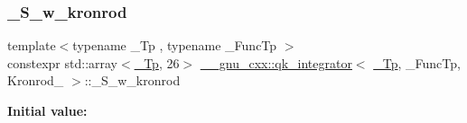 \subsubsection{\texorpdfstring{\+\_\+\+S\+\_\+w\+\_\+kronrod}{\_S\_w\_kronrod}}
{\footnotesize\ttfamily template$<$typename \+\_\+\+Tp , typename \+\_\+\+Func\+Tp $>$ \\
constexpr std\+::array$<$\hyperlink{namespace____gnu__cxx_a3b19a9c800ca194374ef9172290f7d79}{\+\_\+\+Tp}, 26$>$ \hyperlink{class____gnu__cxx_1_1qk__integrator}{\+\_\+\+\_\+gnu\+\_\+cxx\+::qk\+\_\+integrator}$<$ \hyperlink{namespace____gnu__cxx_a3b19a9c800ca194374ef9172290f7d79}{\+\_\+\+Tp}, \+\_\+\+Func\+Tp, Kronrod\+\_ $>$\+::\+\_\+\+S\+\_\+w\+\_\+kronrod\hspace{0.3cm}{\ttfamily [static]}}

{\bfseries Initial value\+:}
